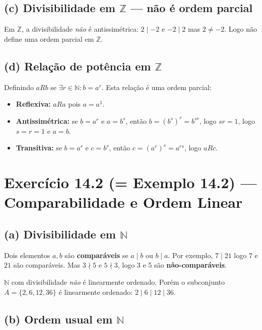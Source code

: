\documentclass[12pt,a4paper]{article}
\newcommand{\keyword}[1]{\textbf{\textcolor{azul}{#1}}}
\begin{document}
\subsection*{(c) Divisibilidade em $\mathbb{Z}$ — não é ordem parcial}

Em $\mathbb{Z}$, a divisibilidade \emph{não} é antissimétrica: $2 \mid -2$ e $-2 \mid 2$
mas $2 \ne -2$. Logo não define uma ordem parcial em $\mathbb{Z}$.

\subsection*{(d) Relação de potência em $\mathbb{Z}$}

Definindo $aRb$ se $\exists r \in \mathbb{N}: b = a^r$. Esta relação é uma ordem parcial:
\begin{itemize}
  \item \textbf{Reflexiva:} $aRa$ pois $a = a^1$.
  \item \textbf{Antissimétrica:} se $b = a^r$ e $a = b^s$, então $b = (b^s)^r = b^{sr}$,
        logo $sr = 1$, logo $s = r = 1$ e $a = b$.
  \item \textbf{Transitiva:} se $b = a^r$ e $c = b^s$, então $c = (a^r)^s = a^{rs}$,
        logo $aRc$.
\end{itemize}

\section*{Exercício 14.2 (= Exemplo 14.2) — Comparabilidade e Ordem Linear}

\subsection*{(a) Divisibilidade em $\mathbb{N}$}

Dois elementos $a, b$ são \keyword{comparáveis} se $a \mid b$ ou $b \mid a$.
Por exemplo, $7 \mid 21$ logo $7$ e $21$ são comparáveis. Mas $3 \nmid 5$ e $5 \nmid 3$,
logo 3 e 5 são \keyword{não-comparáveis}.

$\mathbb{N}$ com divisibilidade \emph{não} é linearmente ordenado. Porém o subconjunto
$A = \{2, 6, 12, 36\}$ é linearmente ordenado: $2 \mid 6 \mid 12 \mid 36$.

\subsection*{(b) Ordem usual em $\mathbb{N}$}
\end{document}
